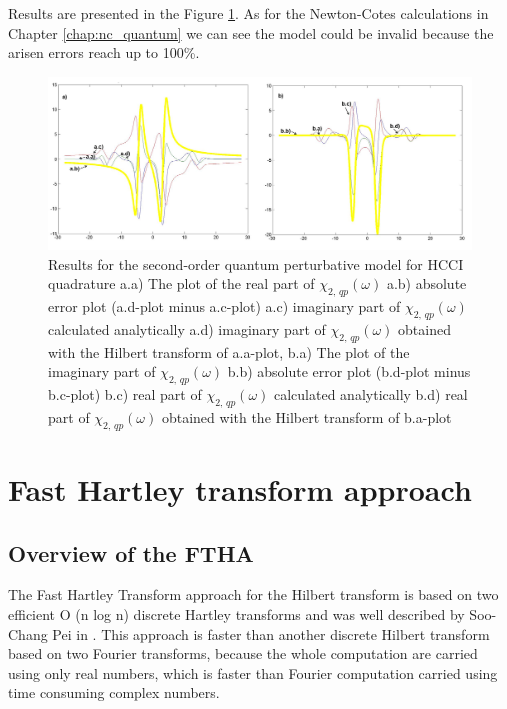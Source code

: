 \documentclass[12pt,twoside,a4paper]{article}
\numberwithin{equation}{subsection}
\numberwithin{figure}{subsection}
\begin{document}
Results are presented in the Figure \ref{fig:hcc_qp2}. As for the Newton-Cotes calculations in Chapter \ref{chap:nc_quantum} we can
see the model could be invalid because the arisen errors reach up to 100\%. 

\begin{figure} 
  \includegraphics[width=150mm]{img/hcc_qp2.png}
  \caption{Results for the second-order quantum perturbative model for HCCI quadrature
     a.a) The plot of the real part of $\chi_{2, \, qp} (\omega )$
     a.b) absolute error plot (a.d-plot minus a.c-plot) 
     a.c) imaginary part of $\chi_{2, \, qp} (\omega )$ calculated analytically 
     a.d) imaginary part of $\chi_{2, \, qp} (\omega )$ obtained with the Hilbert transform of a.a-plot, 
     b.a) The plot of the imaginary part of ${\chi_{2, \,qp}}(\omega )$ 
     b.b) absolute error plot (b.d-plot minus b.c-plot) 
     b.c) real part of $\chi_{2, \, qp} (\omega )$ calculated analytically 
     b.d) real part of $\chi_{2, \, qp} (\omega )$ obtained with the Hilbert transform of b.a-plot 
     \label{fig:hcc_qp2}
     }
\end{figure}


\section{Fast Hartley transform approach} \label{chap:hartley}

\subsection{Overview of the FTHA} \label{chap:hartley_overview}

The Fast Hartley Transform approach for the Hilbert transform is based on two efficient O (n log n) discrete Hartley transforms and
was well described by Soo-Chang Pei in \cite{chang_computation}. This approach is faster than another discrete Hilbert transform
based on two Fourier transforms, because the whole computation are carried using only real numbers, which is faster than Fourier
computation carried using time consuming complex numbers.
\end{document}
